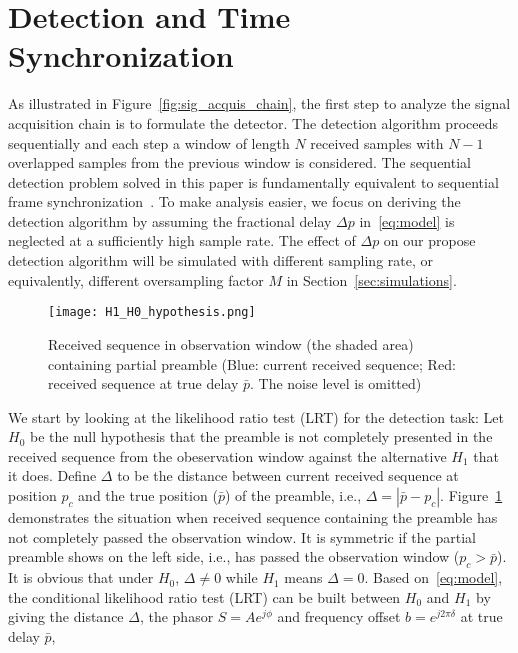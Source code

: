\section{Detection and Time Synchronization}
\label{sec:detection}

As illustrated in Figure~\ref{fig:sig_acquis_chain}, the first step to analyze
the signal acquisition chain is to formulate the detector.
The detection algorithm proceeds sequentially and each step a window of length $N$ received samples with 
$N{-}1$ overlapped samples from the previous window is considered. The sequential detection problem solved 
in this paper is fundamentally equivalent to sequential frame synchronization~\cite{Massey_72,Lui_Tan_86,Scholtz_80}.
To make analysis easier, we focus on deriving the detection algorithm   
by assuming the fractional delay $\Delta p$ in~\eqref{eq:model} is neglected at a sufficiently high sample rate.
The effect of $\Delta p$ on our propose detection algorithm will be simulated with different sampling rate, 
or equivalently, different oversampling factor $M$ in Section~\ref{sec:simulations}. 

\begin{figure}[t]
  \centerline{\texttt{[image: H1\_H0\_hypothesis.png]}}
  \caption{Received sequence in observation window (the shaded area) containing partial preamble (Blue: current received sequence; Red: received sequence at true delay $\bar{p}$. The noise level is omitted)}
  \label{fig:H1_H0_hypothesis}
  \end{figure}

We start by looking at the likelihood ratio test (LRT) for the detection task:
Let $H_0$ be the null hypothesis that the preamble is not completely presented in the received sequence from the obeservation window 
against the alternative $H_1$ that it does. 
Define $\Delta$ to be the distance between current received sequence at position $p_c$ and the true position ($\bar{p}$) of the preamble, 
i.e., $\Delta=|\bar{p}-p_c|$. Figure~\ref{fig:H1_H0_hypothesis} demonstrates the situation when received sequence containing the preamble has not completely passed the observation window.
It is symmetric if the partial preamble shows on the left side, i.e., has passed the observation window ($p_c>\bar{p}$).
It is obvious that under $H_0$, $\Delta \neq 0$ while $H_1$ means $\Delta=0$. 
Based on~\eqref{eq:model}, the conditional likelihood ratio test (LRT) can be built 
between $H_0$ and $H_1$ by giving the distance $\Delta$, the phasor $S{=}Ae^{j\phi}$ and frequency offset $b{=}e^{j2\pi \delta}$
at true delay $\bar{p}$,

